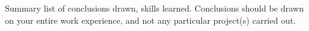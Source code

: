 \documentclass[pdftex, 12pt, a4paper, twoside]{article} %
\renewcommand*\thesubsection{\arabic{section}.\arabic{subsection}}
\begin{document}
Summary list of conclusions drawn, skills learned. Conclusions should be drawn on your entire work experience, and not any particular project(s) carried out.
\lipsum[1-2]




\appendix

\renewcommand*\thesubsection{\Alph{section}.\arabic{subsection}}
\setcounter{figure}{0} \renewcommand{\thefigure}{A.\arabic{figure}}
\setcounter{table}{0} \renewcommand{\thetable}{A.\arabic{table}}




\end{document}
